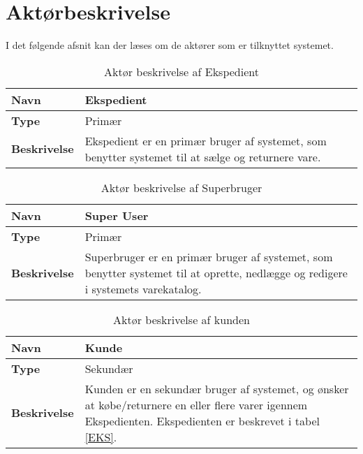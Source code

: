 \section{Aktørbeskrivelse}

I det følgende afsnit kan der læses om de aktører som er tilknyttet systemet. \\

\begin{table}[H]
	\label{EKS}
	\begin{tabularx}{\textwidth}{|l|X|}
		\hline
		\textbf{Navn} & Ekspedient \\
		\hline
		\textbf{Type} & Primær \\
		\hline
		\textbf{Beskrivelse} & Ekspedient er en primær bruger af systemet, som benytter systemet til at sælge og returnere vare. \\
		\hline
	\end{tabularx}
	\captionsetup{justification=raggedright,singlelinecheck=false}
	\caption{Aktør beskrivelse af Ekspedient}
	\label{tab:AktEks}
\end{table}


\begin{table}[H]
	\begin{tabularx}{\textwidth}{|l|X|}
		\hline
		\textbf{Navn} & Super User \\
		\hline
		\textbf{Type} & Primær \\
		\hline
		\textbf{Beskrivelse} & Superbruger er en primær bruger af systemet, som benytter systemet til at oprette, nedlægge og redigere i systemets varekatalog. \\
		\hline
	\end{tabularx}
	\captionsetup{justification=raggedright,singlelinecheck=false}
	\caption{Aktør beskrivelse af Superbruger}
	\label{tab:AktSuu}
\end{table}

\begin{table}[H]
	\label{KD}
	\begin{tabularx}{\textwidth}{|l|X|}
		\hline
		\textbf{Navn} & Kunde \\
		\hline
		\textbf{Type} & Sekundær \\
		\hline
		\textbf{Beskrivelse} & Kunden er en sekundær bruger af systemet, og ønsker at købe/returnere en eller flere varer igennem Ekspedienten. Ekspedienten er beskrevet i tabel \ref{EKS}.   \\
		\hline
	\end{tabularx}
	\captionsetup{justification=raggedright,singlelinecheck=false}
	\caption{Aktør beskrivelse af kunden}
	\label{tab:AktKu}
\end{table}

